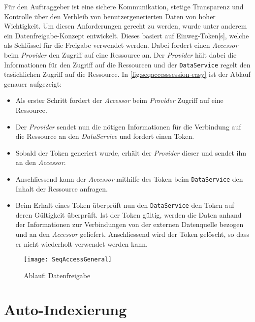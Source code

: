 Für den Auftraggeber ist eine sichere Kommunikation, stetige Transparenz und Kontrolle über den Verbleib von benutzergenerierten Daten von hoher Wichtigkeit. Um diesen Anforderungen gerecht zu werden, wurde unter anderem ein Datenfreigabe-Konzept entwickelt. Dieses basiert auf Einweg-\gls{Token}[s], welche als Schlüssel für die Freigabe verwendet werden.  Dabei fordert einen \textit{Accessor} beim \textit{Provider} den Zugriff auf eine Ressource an. Der \textit{Provider} hält dabei die Informationen für den Zugriff auf die Ressourcen und der \texttt{DataService} regelt den tasächlichen Zugriff auf die Ressource. In \autoref{fig:seqaccesssession-easy} ist der Ablauf genauer aufgezeigt:
\begin{itemize}
    \item Als erster Schritt fordert der \textit{Accessor} beim \textit{Provider} Zugriff auf eine Ressource.
    \item Der \textit{Provider} sendet nun die nötigen Informationen für die Verbindung auf die Ressource an den \textit{DataService} und fordert einen Token.
    \item Sobald der Token generiert wurde, erhält der \textit{Provider} dieser und sendet ihn an den \textit{Accessor}.
    \item Anschliessend kann der \textit{Accessor} mithilfe des Token beim \texttt{Da\-ta\-Ser\-vi\-ce} den Inhalt der Ressource anfragen.
    \item Beim Erhalt eines Token überprüft nun den \texttt{DataService} den Token auf deren Gültigkeit überprüft. Ist der Token gültig, werden die Daten anhand der Informationen zur Verbindungen von der externen Datenquelle bezogen und an den \textit{Accessor} geliefert. Anschliessend wird der Token gelöscht, so dass er nicht wiederholt verwendet werden kann.
\end{itemize}


    \begin{figure}[H]
    \centering
    \texttt{[image: SeqAccessGeneral]}
    \caption{Ablauf: Datenfreigabe}
    \label{fig:seqaccesssession-easy}
    \end{figure}


\section{Auto-Indexierung}

